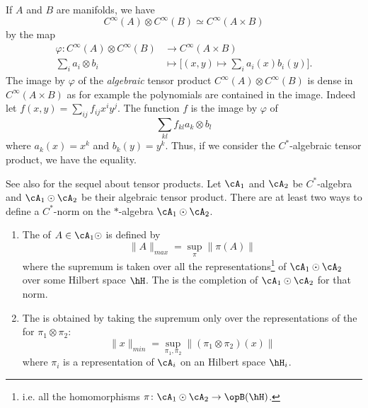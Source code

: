 If $A$ and $B$ are manifolds, we have
\begin{equation}
	C^{\infty}(A)\otimes C^{\infty}(B)\simeq C^{\infty}(A\times B)
\end{equation}
by the map
\begin{equation}        \label{EqIsoCABCACBCstar}
	\begin{aligned}
		\varphi\colon  C^{\infty}(A)\otimes C^{\infty}(B) & \to  C^{\infty}(A\times B)                          \\
		\sum_ia_i\otimes b_i                              & \mapsto \Big[ (x,y)\mapsto\sum_ia_i(x)b_i(y) \Big].
	\end{aligned}
\end{equation}
The image by $\varphi$ of the \emph{algebraic} tensor product $ C^{\infty}(A)\otimes C^{\infty}(B)$ is dense in $ C^{\infty}(A\times B)$ as for example the polynomials are contained in the image. Indeed let $f(x,y)=\sum_{ij}f_{ij}x^iy^j$. The function $f$ is the image by $\varphi$ of
\begin{equation}        \label{EqDecompffklCABCACB}
	\sum_{kl} f_{kl} a_k\otimes b_l
\end{equation}
where $a_k(x)=x^k$ and $b_k(y)=y^k$. Thus, if we consider the $C^*$-algebraic tensor product, we have the equality.

See also \cite{Delaroche} for the sequel about tensor products. Let $\cA_1$ and $\cA_2$ be $C^*$-algebra and $\cA_1\odot\cA_2$ be their algebraic tensor product. There are at least two ways to define a $C^*$-norm on the $*$-algebra $\cA_1\odot\cA_2$.

\begin{enumerate}
	\item
	      The  of $A\in\cA_1\odot$ is defined by
	      \begin{equation}
		      \| A \|_{max}=\sup_{\pi}\| \pi(A) \|
	      \end{equation}
	      where the supremum is taken over all the representations\footnote{i.e. all the homomorphisms $\pi\colon \cA_1\odot\cA_2\to \opB(\hH)$.} of $\cA_1\odot\cA_2$ over some Hilbert space $\hH$. The  is the completion of $\cA_1\odot\cA_2$ for that norm.

	\item
	      The  is obtained by taking the supremum only over the representations of the for $\pi_1\otimes \pi_2$:
	      \begin{equation}
		      \| x \|_{min}=\sup_{\pi_1,\pi_2}\| (\pi_1\otimes\pi_2)(x) \|
	      \end{equation}
	      where $\pi_i$ is a representation of $\cA_i$ on an Hilbert space $\hH_i$.
\end{enumerate}

